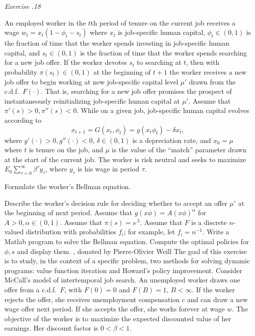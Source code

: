 \medskip\noindent
{\it Exercise \the\chapternum.18} 

\medskip\noindent
An employed  worker in the $t$th period of tenure
on the current job  receives a wage
$w_t = x_t(1 - \phi_t   - s_t)$  where $x_t$ is
job-specific human capital, $\phi_t \in (0,1)$ is
the fraction of time that the  worker spends investing in
job-specific human capital, and $s_t \in (0,1)$ is
the fraction of time that the worker spends searching for
a new job offer.    If the worker devotes $s_t$ to searching
 at  $t$, then with probability $\pi(s_t) \in (0,1)$ at the beginning of
$t+1$ the worker receives a new job offer  to begin working
at new job-specific capital level $\mu'$ drawn from
the c.d.f.\ $F(\cdot)$.  That is, searching for a new job
offer promises the prospect of instantaneously reinitializing
job-specific human capital at $\mu'$.   Assume that
$\pi'(s) >0, \pi''(s) < 0 $.  While on a given job,
job-specific human capital
evolves according to
$$ x_{t+1} = G(x_t, \phi_t) = g(x_t \phi_t) - \delta x_t   ,$$
where $g'(\cdot) > 0, g''(\cdot) < 0$, $\delta \in (0,1)$
is a depreciation rate,  and $x_0 = \mu$ where $t$ is tenure
on the job, and $\mu$ is the value of the ``match'' parameter
drawn at the start of the current job.   The worker is
risk neutral and seeks to maximize $E_0 \sum_{\tau=0}^\infty
\beta^\tau y_\tau$, where $y_\tau$ is his wage in period $\tau$.

\medskip
{}  Formulate the worker's Bellman equation.

\medskip
{} Describe the worker's decision rule
for deciding whether to accept an offer $\mu'$ at the beginning
of next period.
\medskip
{}  Assume that $g(x \phi) = A(x \phi)^\alpha$
for $A >0, \alpha \in (0,1)$.  Assume
that $\pi(s) = s^{.5}$. Assume that $F$ is a discrete
$n$-valued distribution with probabilities $f_i$; for example,
let $f_i = n^{-1}$.  Write a Matlab
program to solve the Bellman equation.  Compute the optimal
policies for $\phi, s$ and display them.
\vfil\eject
\medskip
{} , donated by Pierre-Olivier Weill
\medskip
\noindent The goal of this exercise is to study, in the context of
a specific problem, two methods for solving dynamic programs:
value function iteration and Howard's policy improvement. Consider
McCall's model of intertemporal job search. An unemployed worker
draws one offer from a c.d.f.\ $F$, with $F(0)=0$ and $F(B)=1$,
$B<\infty$. If the worker  rejects the offer, she receives
unemployment compensation $c$ and can draw a new wage offer next
period. If she accepts the offer, she works forever at wage $w$.
The objective of the worker is to maximize the expected discounted
value of her earnings. Her discount factor is $0<\beta<1$.\medskip

